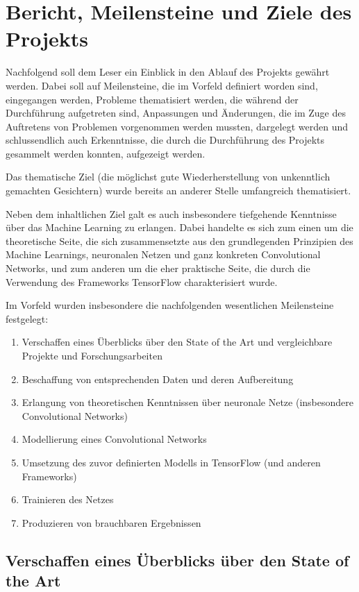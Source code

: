 \section{Bericht, Meilensteine und Ziele des Projekts}

Nachfolgend soll dem Leser ein Einblick in den Ablauf des Projekts gewährt werden. Dabei soll auf Meilensteine, die im
Vorfeld definiert worden sind, eingegangen werden, Probleme thematisiert werden, die während der Durchführung aufgetreten
sind, Anpassungen und Änderungen, die im Zuge des Auftretens von Problemen vorgenommen werden mussten, dargelegt werden
und schlussendlich auch Erkenntnisse, die durch die Durchführung des Projekts gesammelt werden konnten, aufgezeigt werden.

Das thematische Ziel (die möglichst gute Wiederherstellung von unkenntlich gemachten Gesichtern) wurde bereits an anderer
Stelle umfangreich thematisiert.

Neben dem inhaltlichen Ziel galt es auch insbesondere tiefgehende Kenntnisse über das Machine Learning zu erlangen.
Dabei handelte es sich zum einen um die theoretische Seite, die sich zusammensetzte aus den grundlegenden Prinzipien des
Machine Learnings, neuronalen Netzen und ganz konkreten Convolutional Networks, und zum anderen um die eher praktische
Seite, die durch die Verwendung des Frameworks TensorFlow charakterisiert wurde.

Im Vorfeld wurden insbesondere die nachfolgenden wesentlichen Meilensteine festgelegt:

\begin{enumerate}
    \item{Verschaffen eines Überblicks über den State of the Art und vergleichbare Projekte und Forschungsarbeiten}
    \item{Beschaffung von entsprechenden Daten und deren Aufbereitung}
    \item{Erlangung von theoretischen Kenntnissen über neuronale Netze (insbesondere Convolutional Networks)}
    \item{Modellierung eines Convolutional Networks}
    \item{Umsetzung des zuvor definierten Modells in TensorFlow (und anderen Frameworks)}
    \item{Trainieren des Netzes}
    \item{Produzieren von brauchbaren Ergebnissen}
\end{enumerate}

\subsection{Verschaffen eines Überblicks über den State of the Art}

